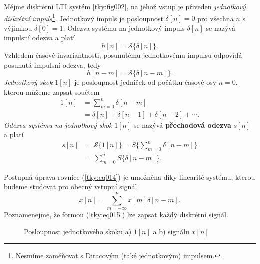       Mějme diskrétní LTI systém \ref{tky:fig002}, na jehož vstup je přiveden \emph{jednotkový
      diskrétní impuls}\footnote{Nesmíme zaměňovat s Diracovým (také jednotkovým) impulsem.}.
      Jednotkový impuls je posloupnost $\delta[n]=0$ pro všechna $n$ s výjimkou $\delta[0]=1$.
      Odezva systému na jednotkový impuls $\delta[n]$ se nazývá impulsní odezva a platí
      \begin{equation}\label{tky:eq011}
        h[n]= \mathcal{S}\{\delta[n]\}.
      \end{equation}
      Vzhledem časové invariantnosti, posunutému jednotkovému impulsu odpovídá posunutá impulsní
      odezva, tedy
      \begin{equation}\label{tky:eq012}
        h[n-m]= \mathcal{S}\{\delta[n-m]\}.
      \end{equation}
      \emph{Jednotkový skok} $1[n]$ je posloupnost jedniček od počátku časové osy $n=0$,
      kterou můžeme zapsat součtem
      \begin{align}
        1[n]&= \sum_{m=0}^n\delta[n-m]                  \nonumber \\
            &=\delta[n]+\delta[n-1]+\delta[n-2]+\cdots. \label{tky:eq013}
      \end{align}
      \emph{Odezva systému na jednotkový skok} $\mathrm{1}[n]$ se nazývá \textbf{přechodová odezva}
      $s[n]$ a platí
      \begin{align}
        s[n]&= \mathcal{S}\{1[n]\}= S\{\sum_{m=0}^n\delta[n-m]\}        \nonumber \\
            &=\sum_{m=0}^nS\{\delta[n-m]\}.                             \label{tky:eq014}
      \end{align}

      Postupná úprava rovnice (\ref{tky:eq014}) je umožněna díky linearitě systému, kterou budeme
      studovat pro obecný vstupní signál
      \begin{equation}\label{tky:eq015}
        x[n]=\sum_{m=-\infty}^\infty x[m]\delta[n-m].
      \end{equation}
      Poznamenejme, že formou (\ref{tky:eq015}) lze zapsat každý diskrétní signál.

      \begin{figure}[ht!]
        \centering  
        \caption{Posloupnost jednotkového skoku a) \(1[n]\) a b) signálu \(x[n]\)}
        \label{tky:fig_006}
      \end{figure}

